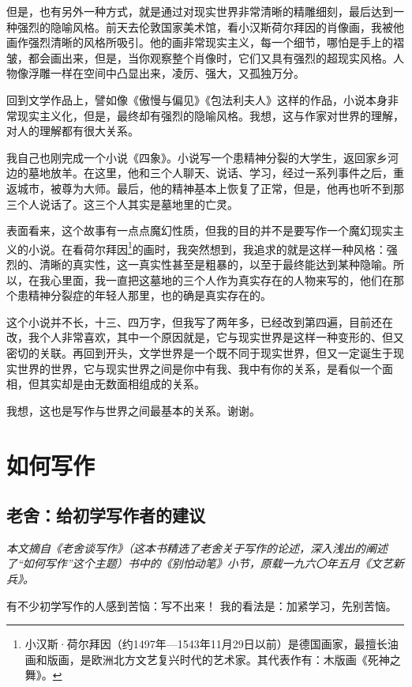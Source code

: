 \documentclass[fontset=fandol,12pt,a5paper]{ctexbook}
\begin{document}
但是，也有另外一种方式，就是通过对现实世界非常清晰的精雕细刻，最后达到一种强烈的隐喻风格。前天去伦敦国家美术馆，看小汉斯荷尔拜因的肖像画，我被他画作强烈清晰的风格所吸引。他的画非常现实主义，每一个细节，哪怕是手上的褶皱，都会画出来，但是，当你观察整个肖像时，它们又具有强烈的超现实风格。人物像浮雕一样在空间中凸显出来，凌厉、强大，又孤独万分。

回到文学作品上，譬如像《傲慢与偏见》《包法利夫人》这样的作品，小说本身非常现实主义化，但是，最终却有强烈的隐喻风格。我想，这与作家对世界的理解，对人的理解都有很大关系。

我自己也刚完成一个小说《四象》。小说写一个患精神分裂的大学生，返回家乡河边的墓地放羊。在这里，他和三个人聊天、说话、学习，经过一系列事件之后，重返城市，被尊为大师。最后，他的精神基本上恢复了正常，但是，他再也听不到那三个人说话了。这三个人其实是墓地里的亡灵。

表面看来，这个故事有一点点魔幻性质，但我的目的并不是要写作一个魔幻现实主义的小说。在看荷尔拜因\footnote{小汉斯·荷尔拜因（约1497年—1543年11月29日以前）是德国画家，最擅长油画和版画，是欧洲北方文艺复兴时代的艺术家。其代表作有：木版画《死神之舞》。}的画时，我突然想到，我追求的就是这样一种风格：强烈的、清晰的真实性，这一真实性甚至是粗暴的，以至于最终能达到某种隐喻。所以，在我心里面，我一直把这墓地的三个人作为真实存在的人物来写的，他们在那个患精神分裂症的年轻人那里，也的确是真实存在的。

这个小说并不长，十三、四万字，但我写了两年多，已经改到第四遍，目前还在改，我个人非常喜欢，其中一个原因就是，它与现实世界是这样一种变形的、但又密切的关联。再回到开头，文学世界是一个既不同于现实世界，但又一定诞生于现实世界的世界，它与现实世界之间是你中有我、我中有你的关系，是看似一个面相，但其实却是由无数面相组成的关系。

我想，这也是写作与世界之间最基本的关系。谢谢。
\newpage

\chapter{如何写作}

\section{老舍：给初学写作者的建议}

\emph{本文摘自《老舍谈写作》（这本书精选了老舍关于写作的论述，深入浅出的阐述了“如何写作”这个主题）书中的《别怕动笔》小节，原载一九六〇年五月《文艺新兵》。}
\vspace{2em}

有不少初学写作的人感到苦恼：写不出来！
我的看法是：加紧学习，先别苦恼。
\end{document}
